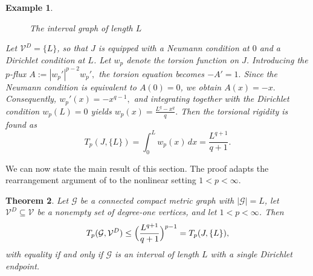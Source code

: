 \documentclass[12pt,a4paper]{article}
\numberwithin{equation}{section}
\newtheorem{theorem}{Theorem}[section]
\newtheorem{example}[theorem]{Example}
\begin{document}
\begin{example}
	\label{ex:J0}
		\begin{figure}\label{interval graph}
		\centering
		\caption{The interval graph of length $L$}
	\end{figure}
	Let $\mathcal{V}^D=\{L\}$, so that $J$ is equipped with a Neumann condition at $0$ and a
	Dirichlet condition at $L$. 
	Let $w_p$ denote the torsion function on $J$. Introducing the $p$-flux
	\(
	A:=|w_p'|^{p-2}w_p',
	\)
	the torsion equation becomes
	\(
	-A'=1.
	\)
	Since the Neumann condition is equivalent to $A(0)=0$, we obtain
	\(
	A(x)=-x.
	\)
	Consequently,
	\(
	w_p'(x)=-x^{q-1},
	\)
	and integrating together with the Dirichlet condition $w_p(L)=0$ yields
	\(
	w_p(x)
	=
	\frac{L^q-x^q}{q}.
	\)
Then the torsional rigidity is found as
	\begin{equation}
		\label{eq:J0}
		T_p(J,\{L\})
		= 	\int_0^Lw_p(x)\,dx
		=
		\frac{L^{q+1}}{q+1}.
	\end{equation}

\end{example}

We can now state the main result of this section. The proof adapts the
rearrangement argument of \cite[Section~5.1]{AST17} to the nonlinear
setting $1<p<\infty$.

\begin{theorem}
	\label{thm:SV}
	Let $\mathcal G$ be a connected compact metric graph with $|\mathcal G|=L$,
	let $\mathcal{V}^D\subseteq \mathcal{V}$ be a nonempty set of degree-one
	vertices, and let $1<p<\infty$. Then
	\begin{equation}
		\label{eq:SV}
		T_p(\mathcal G,\mathcal{V}^D)
		\le
		\Bigl(\frac{L^{q+1}}{q+1}\Bigr)^{p-1}
		=
		T_p(J,\{L\}),
	\end{equation}
	with equality if and only if
	$\mathcal G$ is an interval of length $L$ with a single Dirichlet endpoint.
\end{theorem}
\end{document}
